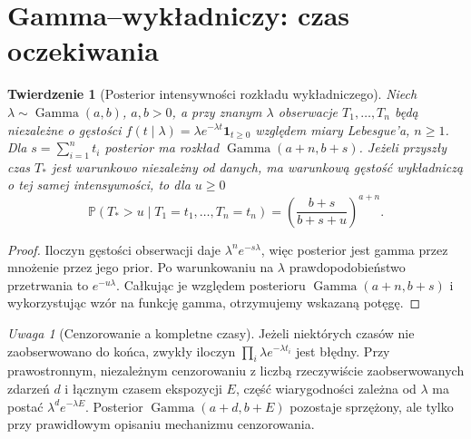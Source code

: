 \documentclass[11pt,a4paper,oneside]{report}
\numberwithin{equation}{chapter}
\theoremstyle{plain}
\newtheorem{twierdzenie}{Twierdzenie}[chapter]
\theoremstyle{definition}
\theoremstyle{remark}
\newtheorem{uwaga}{Uwaga}[chapter]
\newcommand{\Prob}{\mathbb P}
\newcommand{\ind}[1]{\mathbf 1_{#1}}
\begin{document}
\section{Gamma--wykładniczy: czas oczekiwania}
\begin{twierdzenie}[Posterior intensywności rozkładu wykładniczego]
Niech $\lambda\sim\operatorname{Gamma}(a,b)$, $a,b>0$,
a przy znanym $\lambda$ obserwacje $T_1,\ldots,T_n$
będą niezależne o gęstości
$f(t\mid\lambda)=\lambda e^{-\lambda t}\ind{t\ge0}$
względem miary Lebesgue'a, $n\ge1$.
Dla $s=\sum_{i=1}^n t_i$ posterior ma rozkład
$\operatorname{Gamma}(a+n,b+s)$.
Jeżeli przyszły czas $T_*$ jest warunkowo niezależny od danych,
ma warunkową gęstość wykładniczą o tej samej intensywności,
to dla $u\ge0$
\[
 \Prob(T_*>u\mid T_1=t_1,\ldots,T_n=t_n)
 =\left(\frac{b+s}{b+s+u}\right)^{a+n}.
\]
\end{twierdzenie}
\begin{proof}
Iloczyn gęstości obserwacji daje $\lambda^n e^{-s\lambda}$,
więc posterior jest gamma przez mnożenie przez jego prior.
Po warunkowaniu na $\lambda$ prawdopodobieństwo przetrwania
to $e^{-u\lambda}$. Całkując je względem posterioru
$\operatorname{Gamma}(a+n,b+s)$ i wykorzystując wzór na
funkcję gamma, otrzymujemy wskazaną potęgę.
\end{proof}

\begin{uwaga}[Cenzorowanie a kompletne czasy]
Jeżeli niektórych czasów nie zaobserwowano do końca, zwykły
iloczyn $\prod_i\lambda e^{-\lambda t_i}$ jest błędny.
Przy prawostronnym, niezależnym cenzorowaniu z liczbą
rzeczywiście zaobserwowanych zdarzeń $d$ i łącznym czasem
ekspozycji $E$, część wiarygodności zależna od $\lambda$
ma postać $\lambda^d e^{-\lambda E}$. Posterior
$\operatorname{Gamma}(a+d,b+E)$ pozostaje sprzężony,
ale tylko przy prawidłowym opisaniu mechanizmu cenzorowania.
\end{uwaga}
\end{document}
